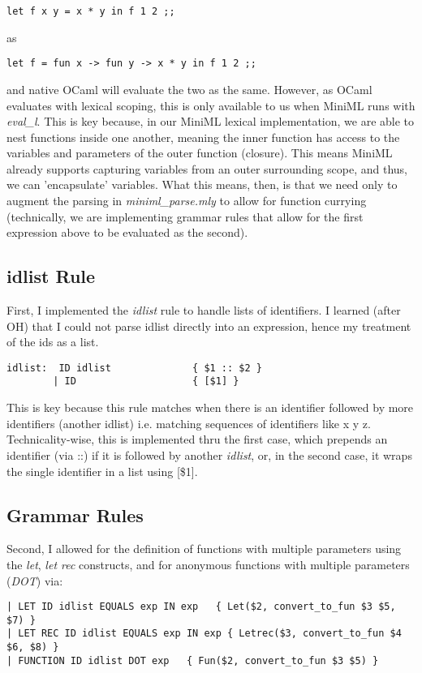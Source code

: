 \documentclass[12pt]{article}
\begin{document}
\begin{verbatim}
let f x y = x * y in f 1 2 ;;
\end{verbatim}
as
\begin{verbatim}
let f = fun x -> fun y -> x * y in f 1 2 ;;
\end{verbatim}
and native OCaml will evaluate the two as the same. However, as OCaml evaluates with lexical scoping, this is only available to us when MiniML runs with \textit{eval\_l}. This is key because, in our MiniML lexical implementation, we are able to nest functions inside one another, meaning the inner function has access to the variables and parameters of the outer function (closure). This means MiniML already supports capturing variables from an outer surrounding scope, and thus, we can 'encapsulate' variables. What this means, then, is that we need only to augment the parsing in \textit{miniml\_parse.mly} to allow for function currying (technically, we are implementing grammar rules that allow for the first expression above to be evaluated as the second).

\subsection*{idlist Rule}
First, I implemented the \textit{idlist} rule to handle lists of identifiers. I learned (after OH) that I could not parse idlist directly into an expression, hence my treatment of the ids as a list.

\begin{verbatim}
idlist:  ID idlist              { $1 :: $2 }
        | ID                    { [$1] }
\end{verbatim}

This is key because this rule matches when there is an identifier followed by more identifiers (another idlist) i.e. matching sequences of identifiers like x y z. Technicality-wise, this is implemented thru the first case, which prepends an identifier (via ::) if it is followed by another \textit{idlist}, or, in the second case, it wraps the single identifier in a list using [\$1].

\subsection*{Grammar Rules}
Second, I allowed for the definition of functions with multiple parameters using the \textit{let}, \textit{let rec} constructs, and for anonymous functions with multiple parameters (\textit{DOT}) via:
\begin{verbatim}
| LET ID idlist EQUALS exp IN exp   { Let($2, convert_to_fun $3 $5, $7) }
| LET REC ID idlist EQUALS exp IN exp { Letrec($3, convert_to_fun $4 $6, $8) }
| FUNCTION ID idlist DOT exp   { Fun($2, convert_to_fun $3 $5) }
\end{verbatim}
\end{document}
